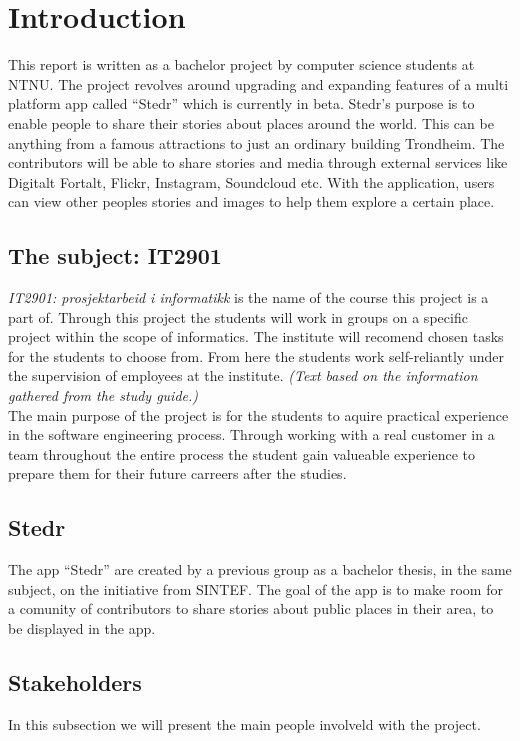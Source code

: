 \section{Introduction}
\thispagestyle{plain}
	\setcounter{page}{1}


This report is written as a bachelor project by computer science students at NTNU. The project revolves around upgrading and expanding features of a multi platform app called “Stedr” which is currently in beta. Stedr's purpose is to enable people to share their stories about places around the world. This can be anything from a famous attractions to just an ordinary building Trondheim. The contributors will be able to share stories and media through external services like Digitalt Fortalt, Flickr, Instagram, Soundcloud etc. With the application, users can view other peoples stories and images  to help them explore a certain place.

\subsection{The subject: IT2901}
\emph{IT2901: prosjektarbeid i informatikk} is the name of the course this project is a part of. Through this project the students will work in groups on a specific project within the scope of informatics. The institute will recomend chosen tasks for the students to choose from. From here the students work self-reliantly under the supervision of employees at the institute. \textit{(Text based on the information gathered from the study guide.)}\\ The main purpose of the project is for the students to aquire practical experience in the software engineering process. Through working with a real customer in a team throughout the entire process the student gain valueable experience to prepare them for their future carreers after the studies.

\subsection{Stedr}
The app “Stedr” are created by a previous group as a bachelor thesis, in the same subject, on the initiative from SINTEF. The goal of the app is to make room for a comunity of contributors to share stories about public places in their area, to be displayed in the app. 

\subsection{Stakeholders}
In this subsection we will present the main people involveld with the project. 

